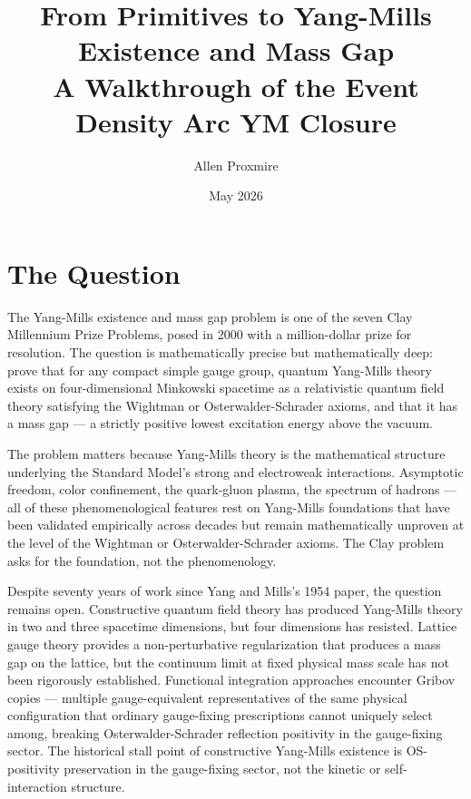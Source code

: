 \documentclass[11pt,a4paper]{article}
\title{\vspace{-1cm}\Large\bfseries From Primitives to Yang-Mills Existence and Mass Gap\\[6pt]
\large\mdseries A Walkthrough of the Event Density Arc YM Closure}
\author{Allen Proxmire}
\date{May 2026}
\begin{document}
\maketitle

\section{The Question}

The Yang-Mills existence and mass gap problem is one of the seven Clay Millennium Prize Problems, posed in 2000 with a million-dollar prize for resolution. The question is mathematically precise but mathematically deep: prove that for any compact simple gauge group, quantum Yang-Mills theory exists on four-dimensional Minkowski spacetime as a relativistic quantum field theory satisfying the Wightman or Osterwalder-Schrader axioms, and that it has a mass gap --- a strictly positive lowest excitation energy above the vacuum.

The problem matters because Yang-Mills theory is the mathematical structure underlying the Standard Model's strong and electroweak interactions. Asymptotic freedom, color confinement, the quark-gluon plasma, the spectrum of hadrons --- all of these phenomenological features rest on Yang-Mills foundations that have been validated empirically across decades but remain mathematically unproven at the level of the Wightman or Osterwalder-Schrader axioms. The Clay problem asks for the foundation, not the phenomenology.

Despite seventy years of work since Yang and Mills's 1954 paper, the question remains open. Constructive quantum field theory has produced Yang-Mills theory in two and three spacetime dimensions, but four dimensions has resisted. Lattice gauge theory provides a non-perturbative regularization that produces a mass gap on the lattice, but the continuum limit at fixed physical mass scale has not been rigorously established. Functional integration approaches encounter Gribov copies --- multiple gauge-equivalent representatives of the same physical configuration that ordinary gauge-fixing prescriptions cannot uniquely select among, breaking Osterwalder-Schrader reflection positivity in the gauge-fixing sector. The historical stall point of constructive Yang-Mills existence is OS-positivity preservation in the gauge-fixing sector, not the kinetic or self-interaction structure.
\end{document}
